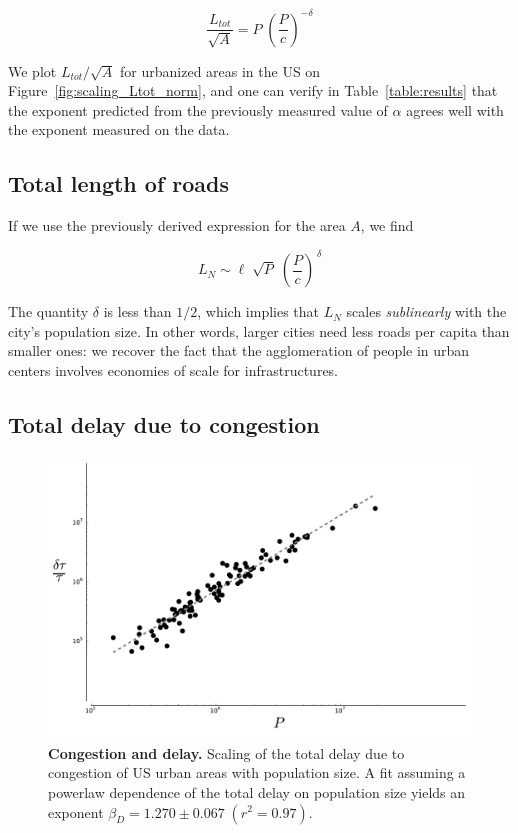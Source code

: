 \begin{equation}
    \frac{L_{tot}}{\sqrt{A}} = P\; \left(\frac{P}{c}\right)^{-\delta}
    \label{eq:travelled_length}
\end{equation}

We plot $L_{tot} / \sqrt{A}$ for urbanized areas in the US on
Figure~\ref{fig:scaling_Ltot_norm}, and one
can verify in Table~\ref{table:results} that the exponent predicted from the previously measured
value of $\alpha$ agrees well with the exponent measured on the data.


\subsection{Total length of roads}

If we use the previously derived expression for the area $A$, we find

\begin{equation}
    L_N \sim \ell \; \sqrt{P}\; \left(\frac{P}{c}\right)^{\,\delta}
\end{equation}

The quantity $\delta$ is less than $1/2$, which implies that $L_N$ scales
\emph{sublinearly} with the city's population size. In other words, larger
cities need less roads per capita than smaller ones: we recover the fact that
 the agglomeration of people in urban centers involves economies of scale for
infrastructures. 


\subsection{Total delay due to congestion}

\begin{figure}
    \centering
    \includegraphics[width=\textwidth]{gfx/chapter-scaling/scaling_delay.pdf}
    \caption{{\bf Congestion and delay.} Scaling of the total delay due to congestion of US urban areas with
    population size. A fit assuming a powerlaw dependence of the total delay on
population size yields an exponent $\beta_D = 1.270 \pm 0.067\;(r^2=0.97)$.\label{fig:scaling_delay}}
\end{figure}

